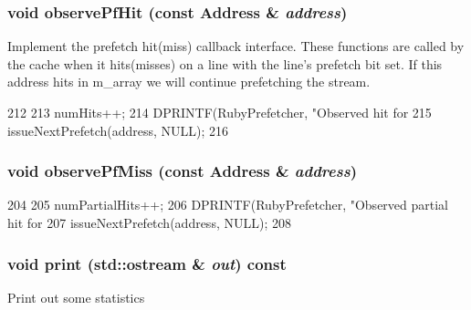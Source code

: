 \hypertarget{classPrefetcher_ad42b59b907f12b2820fda827538f272f}{
\subsubsection[{observePfHit}]{\setlength{\rightskip}{0pt plus 5cm}void observePfHit (const {\bf Address} \& {\em address})}}
\label{classPrefetcher_ad42b59b907f12b2820fda827538f272f}
Implement the prefetch hit(miss) callback interface. These functions are called by the cache when it hits(misses) on a line with the line's prefetch bit set. If this address hits in m\_\-array we will continue prefetching the stream. 


\begin{DoxyCode}
212 {
213     numHits++;
214     DPRINTF(RubyPrefetcher, "Observed hit for %
215     issueNextPrefetch(address, NULL);
216 }
\end{DoxyCode}
\hypertarget{classPrefetcher_a54bad4fe990aa1c8c9e3910c7c972089}{
\subsubsection[{observePfMiss}]{\setlength{\rightskip}{0pt plus 5cm}void observePfMiss (const {\bf Address} \& {\em address})}}
\label{classPrefetcher_a54bad4fe990aa1c8c9e3910c7c972089}



\begin{DoxyCode}
204 {
205     numPartialHits++;
206     DPRINTF(RubyPrefetcher, "Observed partial hit for %
207     issueNextPrefetch(address, NULL);
208 }
\end{DoxyCode}
\hypertarget{classPrefetcher_ac55fe386a101fbae38c716067c9966a0}{
\subsubsection[{print}]{\setlength{\rightskip}{0pt plus 5cm}void print (std::ostream \& {\em out}) const}}
\label{classPrefetcher_ac55fe386a101fbae38c716067c9966a0}
Print out some statistics 


